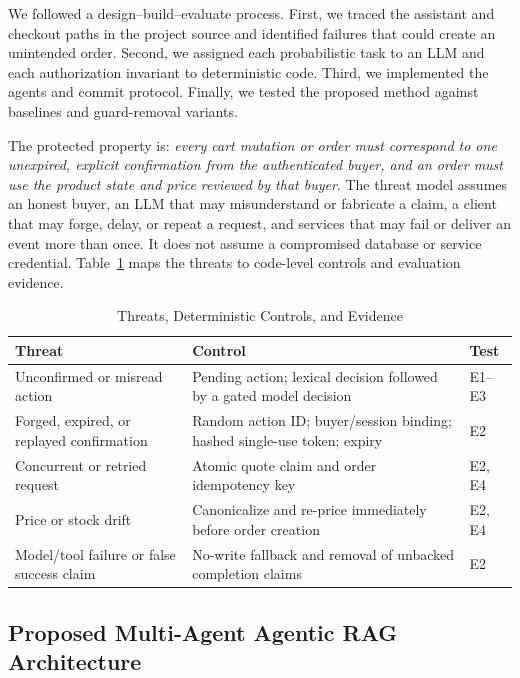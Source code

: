 \documentclass{IEEEtran}
\begin{document}
We followed a design--build--evaluate process. First, we traced the assistant and checkout paths in the project source and identified failures that could create an unintended order. Second, we assigned each probabilistic task to an LLM and each authorization invariant to deterministic code. Third, we implemented the agents and commit protocol. Finally, we tested the proposed method against baselines and guard-removal variants.

The protected property is: \emph{every cart mutation or order must correspond to one unexpired, explicit confirmation from the authenticated buyer, and an order must use the product state and price reviewed by that buyer}. The threat model assumes an honest buyer, an LLM that may misunderstand or fabricate a claim, a client that may forge, delay, or repeat a request, and services that may fail or deliver an event more than once. It does not assume a compromised database or service credential. Table~\ref{tab:threats} maps the threats to code-level controls and evaluation evidence.

\begin{table}[t]
\caption{Threats, Deterministic Controls, and Evidence}
\label{tab:threats}
\centering
\footnotesize
\setlength{\tabcolsep}{3pt}
\begin{tabular}{@{}p{19mm}p{45mm}p{10mm}@{}}
\toprule
Threat & Control & Test \\
\midrule
Unconfirmed or misread action & Pending action; lexical decision followed by a gated model decision & E1--E3 \\
Forged, expired, or replayed confirmation & Random action ID; buyer/session binding; hashed single-use token; expiry & E2 \\
Concurrent or retried request & Atomic quote claim and order idempotency key & E2, E4 \\
Price or stock drift & Canonicalize and re-price immediately before order creation & E2, E4 \\
Model/tool failure or false success claim & No-write fallback and removal of unbacked completion claims & E2 \\
\bottomrule
\end{tabular}
\end{table}

\subsection{Proposed Multi-Agent Agentic RAG Architecture}
\end{document}
